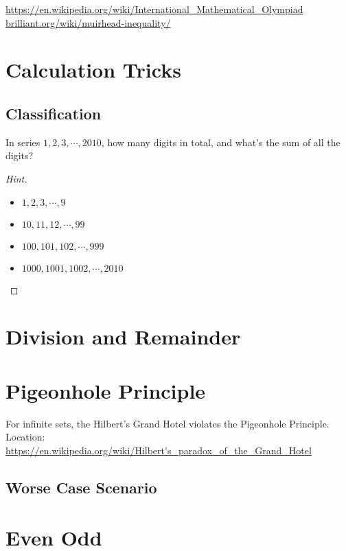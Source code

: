 \url{https://en.wikipedia.org/wiki/International_Mathematical_Olympiad}
\url{brilliant.org/wiki/muirhead-inequality/}

\chapter{Calculation Tricks}
\label{chap:calculation-tricks}

\section{Classification}
\label{sec:classification-method}

\begin{example}
  In series $1,2,3,\cdots,2010$, how many digits in total, and what's the sum of all the digits?
\end{example}
\begin{proof}[Hint]
  \begin{itemize}
  \item $1,2,3,\cdots,9$
  \item $10,11,12,\cdots,99$
  \item $100,101,102,\cdots,999$
  \item $1000,1001,1002,\cdots,2010$
  \end{itemize}
\end{proof}


\chapter{Division and Remainder}
\label{chap:division-and-remainder}

\chapter{Pigeonhole Principle}
\label{chap:pigeonhole-principle}

For infinite sets, the Hilbert's Grand Hotel violates the Pigeonhole Principle.
Location: \url{https://en.wikipedia.org/wiki/Hilbert's_paradox_of_the_Grand_Hotel}

\section{Worse Case Scenario}
\label{sec:worst-case-scenario}



\chapter{Even Odd}
\label{chap:even-odd}

